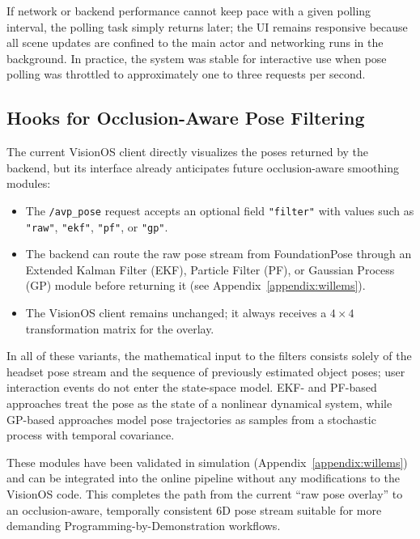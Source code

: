 If network or backend performance cannot keep pace with a given polling interval, the polling task simply returns later; the UI remains responsive because all scene updates are confined to the main actor and networking runs in the background. In practice, the system was stable for interactive use when pose polling was throttled to approximately one to three requests per second.

\subsection{Hooks for Occlusion-Aware Pose Filtering}

The current VisionOS client directly visualizes the poses returned by the backend, but its interface already anticipates future occlusion-aware smoothing modules:

\begin{itemize}
    \item The \texttt{/avp\_pose} request accepts an optional field \texttt{"filter"} with values such as \texttt{"raw"}, \texttt{"ekf"}, \texttt{"pf"}, or \texttt{"gp"}.
    \item The backend can route the raw pose stream from FoundationPose through an Extended Kalman Filter (EKF), Particle Filter (PF), or Gaussian Process (GP) module before returning it (see Appendix~\ref{appendix:willems}).
    \item The VisionOS client remains unchanged; it always receives a $4\times 4$ transformation matrix for the overlay.
\end{itemize}

In all of these variants, the mathematical input to the filters consists solely of the headset pose stream and the sequence of previously estimated object poses; user interaction events do not enter the state-space model. EKF- and PF-based approaches treat the pose as the state of a nonlinear dynamical system, while GP-based approaches model pose trajectories as samples from a stochastic process with temporal covariance.

These modules have been validated in simulation (Appendix~\ref{appendix:willems}) and can be integrated into the online pipeline without any modifications to the VisionOS code. This completes the path from the current “raw pose overlay” to an occlusion-aware, temporally consistent 6D pose stream suitable for more demanding Programming-by-Demonstration workflows.
